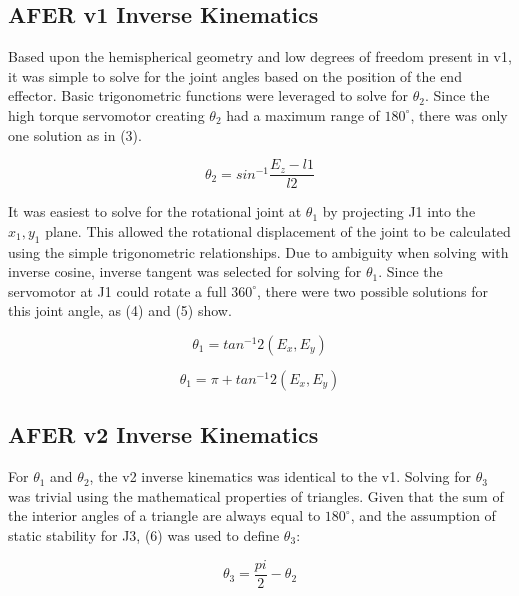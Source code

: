 \subsection {AFER v1 Inverse Kinematics}
Based upon the hemispherical geometry and low degrees of freedom present in v1, it was simple to solve for the joint angles based on the position of the end effector. Basic trigonometric functions were leveraged to solve for $\theta_{2}$. Since the high torque servomotor creating $\theta_{2}$ had a maximum range of $180^{\circ}$, there was only one solution as in (3).

\begin{equation}
\theta_{2} = sin^{-1}\frac{E_{z} - \textit{l1}}{\textit{l2}} \label{eq3}
\end{equation}

It was easiest to solve for the rotational joint at $\theta_{1}$ by projecting J1 into the $x_{1}, y_{1}$ plane. This allowed the rotational displacement of the joint to be calculated using the simple trigonometric relationships. Due to ambiguity when solving with inverse cosine, inverse tangent was selected for solving for $\theta_{1}$. Since the servomotor at J1 could rotate a full $360^{\circ}$, there were two possible solutions for this joint angle, as (4) and (5) show.


\begin{equation}
\theta_{1} = tan^{-1} 2(E_{x},E_{y})\label{eq4}
\end{equation}

\begin{equation}
\theta_{1} = \pi + tan^{-1} 2(E_{x},E_{y})\label{eq5}
\end{equation}

\subsection{AFER v2 Inverse Kinematics}
For $\theta_{1}$ and $\theta_{2}$, the v2 inverse kinematics was identical to the v1. Solving for $\theta_{3}$ was trivial using the mathematical properties of triangles. Given that the sum of the interior angles of a triangle are always equal to $180^{\circ}$, and the assumption of static stability for J3, (6) was used to define $\theta_{3}$:

\begin{equation}
\theta_{3} = \frac{pi}{2} - \theta_{2} \label{eq6}
\end{equation}

